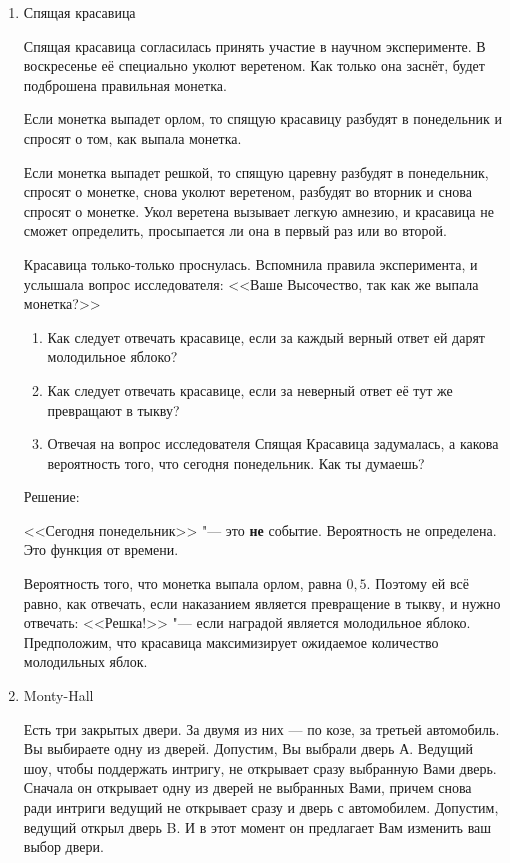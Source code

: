 \documentclass{tufte-handout}
\begin{document}
\begin{enumerate}
\item Спящая красавица

Спящая красавица согласилась принять участие в научном
эксперименте. В воскресенье её специально уколют веретеном. Как
только она заснёт, будет подброшена правильная монетка. 


Если
монетка выпадет орлом, то спящую красавицу разбудят в понедельник
и спросят о том, как выпала монетка. 


Если монетка выпадет решкой,
то спящую царевну разбудят в понедельник, спросят о монетке, снова
уколют веретеном, разбудят во вторник и снова спросят о монетке.
Укол веретена вызывает легкую амнезию, и красавица не сможет
определить, просыпается ли она в первый раз или во второй.


Красавица только-только проснулась. Вспомнила правила эксперимента, и услышала вопрос исследователя: <<Ваше Высочество, так как же выпала монетка?>>
\begin{enumerate}
\item Как следует отвечать красавице, если за каждый верный ответ ей
дарят молодильное яблоко?
\item Как следует отвечать красавице, если за неверный ответ её тут
же превращают в тыкву?
\item Отвечая на вопрос исследователя Спящая Красавица задумалась, а какова вероятность того, что сегодня понедельник. Как ты думаешь?
\end{enumerate}


Решение: 


<<Сегодня понедельник>> "--- это \textbf{не} событие. Вероятность не
определена. Это функция от времени.

Вероятность того, что монетка выпала орлом, равна $0{,}5$. Поэтому ей
всё равно, как отвечать, если наказанием является превращение в
тыкву, и нужно отвечать: <<Решка!>> "--- если наградой является
молодильное яблоко. Предположим, что красавица максимизирует
ожидаемое количество молодильных яблок. 


\item Monty-Hall 

Есть три закрытых двери. За двумя из них --- по козе, за третьей автомобиль. Вы выбираете одну из дверей. Допустим, Вы выбрали дверь А. Ведущий шоу, чтобы поддержать интригу, не открывает сразу выбранную Вами дверь. Сначала он открывает одну из дверей не выбранных Вами, причем снова ради интриги ведущий не открывает сразу и дверь с автомобилем. Допустим, ведущий открыл дверь B. И в этот момент он предлагает Вам изменить ваш выбор двери.


\end{enumerate}
\end{document}

